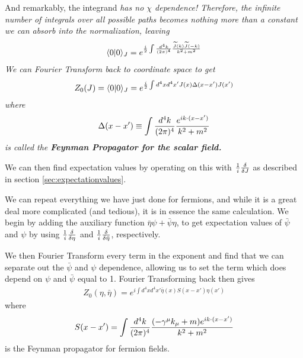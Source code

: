 \documentclass[12pt,epsf]{article}
\def\nolabel{\nonumber }
\def\nolabel{\nonumber }
\begin{document}
And remarkably, the integrand \it has no $\chi$ dependence\rm! 
Therefore, the infinite number of integrals over all possible paths
becomes nothing more than a constant we can absorb into the
normalization, leaving 
\begin{eqnarray}
\langle 0 | 0 \rangle_J =e^{{i \over 2} \int {d^4k \over
(2\pi)^4}{\widetilde{J}(k) \widetilde{J}(-k) \over k^2+m^2}}\nolabel
\end{eqnarray}
We can Fourier Transform back to coordinate space to get 
\begin{eqnarray}
Z_0(J) = \langle 0 | 0 \rangle_J = e^{{i \over 2} \int d^4x d^4x' J(x)
\Delta(x-x')J(x')} \label{eq:z0boson}
\end{eqnarray}
where 
\begin{eqnarray}
\Delta(x-x') \equiv \int {d^4k \over (2\pi)^4} {e^{i k\cdot (x-x')}
\over k^2+m^2}\nolabel
\end{eqnarray}
is called the \bf Feynman Propagator \rm for the scalar field.	

We can then find expectation values by operating on this with ${1\over
i}{\delta \over \delta J}$ as described in section
\ref{sec:expectationvalues}.  

We can repeat everything we have just done for fermions, and while it
is a great deal more complicated (and tedious), it is in essence the
same calculation.  We begin by adding the auxiliary function $\bar \eta
\psi + \bar \psi \eta$, to get expectation values of $\bar \psi$ and
$\psi$ by using ${1\over i} {\delta \over \delta \eta}$ and ${1\over i}
{\delta \over \delta \bar \eta}$, respectively.  

We then Fourier Transform every term in the exponent and find that we
can separate out the $\bar \psi$ and $\psi$ dependence, allowing us to
set the term which does depend on $\psi$ and $\bar \psi$ equal to 1. 
Fourier Transforming back then gives
\begin{eqnarray}
Z_0(\eta,\bar \eta) = e^{i \int d^4x d^4x' \bar \eta(x)S(x-x')\eta(x')}
\label{eq:z0fermion}
\end{eqnarray}
where 
\begin{eqnarray}
S(x-x') = \int {d^4k \over (2\pi)^4} {(-\gamma^{\mu}k_{\mu} +
m)e^{ik\cdot (x-x')} \over k^2 + m^2}\nolabel
\end{eqnarray}
is the Feynman propagator for fermion fields.  
\end{document}

